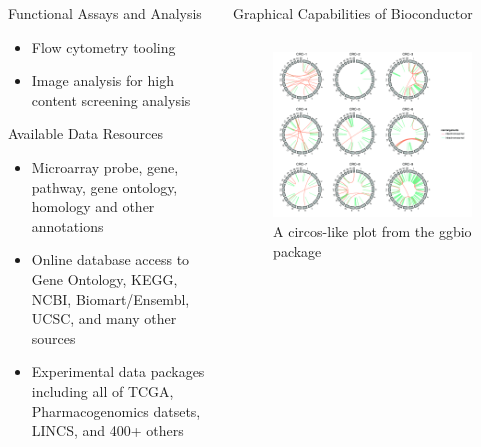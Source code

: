 \documentclass[final]{beamer}
\begin{document}
\begin{frame}[t]
\begin{columns}[t]
\begin{column}{0.24\linewidth}
\begin{block}{Functional Assays and Analysis}
\begin{itemize}
        \item{Flow cytometry tooling}
        \item{Image analysis for high content screening analysis}
        \end{itemize}
      \end{block}
      \begin{block}{Available Data Resources}
        \begin{itemize}
          \item{Microarray probe, gene, pathway, gene ontology, homology and other annotations} 
          \item{Online database access to Gene Ontology, KEGG, NCBI, Biomart/Ensembl, UCSC, and many other sources}
          \item{Experimental data packages including all of TCGA, Pharmacogenomics datsets, LINCS, and 400+ others}
        \end{itemize}
      \end{block}
    \end{column}
    \begin{column}{0.48\linewidth}
      \begin{block}{Graphical Capabilities of Bioconductor}
        \begin{columns}[t]
          \begin{column}{0.33\linewidth}
            \begin{figure}
              \centering
              \includegraphics[width=0.85\linewidth]{cir}
              \caption{A circos-like plot from the ggbio package}
            \end{figure}
            \begin{figure}

\end{figure}
\end{column}
\end{columns}
\end{block}
\end{column}
\end{columns}
\end{frame}
\end{document}
